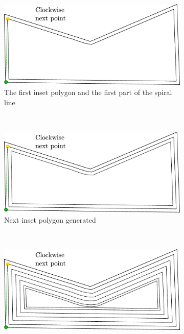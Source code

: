\begin{figure}[htbp]
	\centering
    \begin{subfigure}[b]{0.45\textwidth}
    		\includegraphics[width=\textwidth]{images/algorithms/spiral_fill/2.pdf}
		\caption{The first inset polygon and the first part of the spiral line}
    \end{subfigure}
    ~
    \begin{subfigure}[b]{0.45\textwidth}
    		\includegraphics[width=\textwidth]{images/algorithms/spiral_fill/3.pdf}
    		\caption{Next inset polygon generated}
    \end{subfigure}\\
    \begin{subfigure}[b]{0.45\textwidth}
    		\includegraphics[width=\textwidth]{images/algorithms/spiral_fill/4.pdf}

\end{subfigure}
\end{figure}
